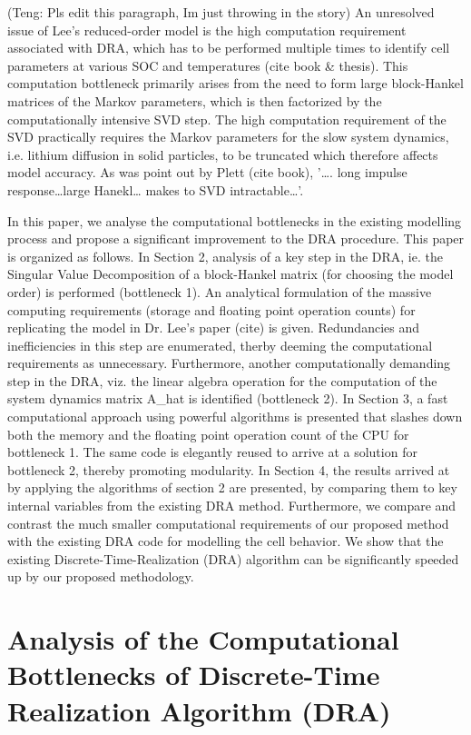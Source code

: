 (Teng: Pls edit this paragraph, Im just throwing in the story) An
unresolved issue of Lee\textquoteright s reduced-order model is the
high computation requirement associated with DRA, which has to be
performed multiple times to identify cell parameters at various SOC
and temperatures (cite book \& thesis). This computation bottleneck
primarily arises from the need to form large block-Hankel matrices
of the Markov parameters, which is then factorized by the computationally
intensive SVD step. The high computation requirement of the SVD practically
requires the Markov parameters for the slow system dynamics, i.e.
lithium diffusion in solid particles, to be truncated which therefore
affects model accuracy. As was point out by Plett (cite book), \textquoteright \dots .
long impulse response\dots large Hanekl\dots{} makes to SVD intractable\dots \textquoteright .


In this paper, we analyse the computational bottlenecks in the existing
modelling process and propose a significant improvement to the DRA
procedure. This paper is organized as follows. In Section 2, analysis
of a key step in the DRA, ie. the Singular Value Decomposition of
a block-Hankel matrix (for choosing the model order) is performed
(bottleneck 1). An analytical formulation of the massive computing
requirements (storage and floating point operation counts) for replicating
the model in Dr. Lee's paper (cite) is given. Redundancies and inefficiencies
in this step are enumerated, therby deeming the computational requirements
as unnecessary. Furthermore, another computationally demanding step
in the DRA, viz. the linear algebra operation for the computation
of the system dynamics matrix A\_hat is identified (bottleneck 2).
In Section 3, a fast computational approach using powerful algorithms
is presented that slashes down both the memory and the floating point
operation count of the CPU for bottleneck 1. The same code is elegantly
reused to arrive at a solution for bottleneck 2, thereby promoting
modularity. In Section 4, the results arrived at by applying the algorithms
of section 2 are presented, by comparing them to key internal variables
from the existing DRA method. Furthermore, we compare and contrast
the much smaller computational requirements of our proposed method
with the existing DRA code for modelling the cell behavior. We show
that the existing Discrete-Time-Realization (DRA) algorithm can be
significantly speeded up by our proposed methodology.

\section{Analysis of the Computational Bottlenecks of Discrete-Time Realization
Algorithm (DRA)}

